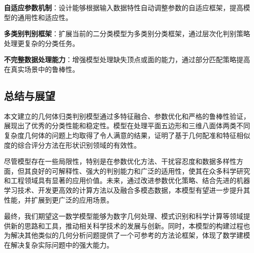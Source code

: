      \textbf{自适应参数机制}：设计能够根据输入数据特性自动调整参数的自适应框架，提高模型的通用性和适应性。
    
     \textbf{多类别判别框架}：扩展当前的二分类模型为多类别分类框架，通过层次化判别策略处理更复杂的分类任务。
    
     \textbf{不完整数据处理能力}：增强模型处理缺失顶点或面的能力，通过部分匹配策略提高在真实场景中的鲁棒性。


\subsection{总结与展望}

本文建立的几何体归类判别模型通过多特征融合、参数优化和严格的鲁棒性验证，展现出了优秀的分类性能和稳定性。模型在处理平面五边形和三维八面体两类不同复杂度几何体的问题上均取得了令人满意的结果，证明了基于几何配准和特征相似度的综合评分方法在形状识别领域的有效性。

尽管模型存在一些局限性，特别是在参数优化方法、干扰容忍度和数据多样性方面，但其良好的可解释性、强大的判别能力和广泛的适用性，使其在众多科学研究和工程领域具有显著的应用价值。未来，通过改进参数优化策略、结合先进的机器学习技术、开发更高效的计算方法以及融合多模态数据，本模型有望进一步提升其性能，并扩展到更广泛的应用场景。

最终，我们期望这一数学模型能够为数字几何处理、模式识别和科学计算等领域提供新的思路和工具，推动相关科学技术的发展与创新。同时，本模型的构建过程也为解决其他类似的几何分析问题提供了一个可参考的方法论框架，体现了数学建模在解决复杂实际问题中的强大能力。
